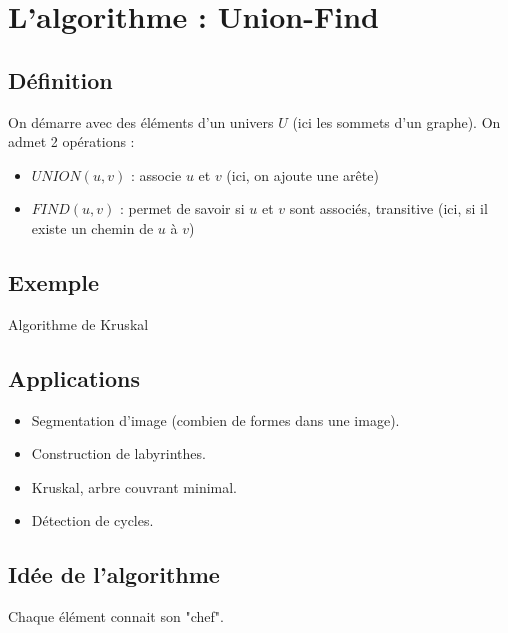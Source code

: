 \chapter{L'algorithme : Union-Find}

\section{Définition}

On démarre avec des éléments d'un univers $U$ (ici les sommets d'un graphe). On admet 2 opérations :
\begin{itemize}
\item{} $UNION (u, v)$ : associe $u$ et $v$ (ici, on ajoute une arête)
\item{} $FIND (u, v)$ : permet de savoir si $u$ et $v$ sont associés, transitive (ici, si il existe un chemin de $u$ à $v$)
\end{itemize}

\section{Exemple}

\begin{algorithm}[h]
\caption{Algorithme de Kruskal}
\begin{algorithmic}
  \ELSE {} \ENDIF
\ENDFOR
\end{algorithmic}
\end{algorithm}

\section{Applications}
\begin{itemize}
\item Segmentation d'image (combien de formes dans une image).
\item Construction de labyrinthes.
\item Kruskal, arbre couvrant minimal.
\item Détection de cycles.
\end{itemize}

\section{Idée de l'algorithme}

Chaque élément connait son "chef".

